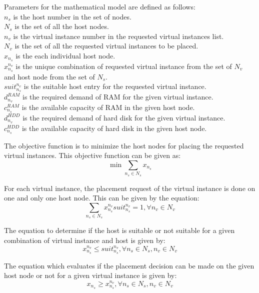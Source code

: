 Parameters for the mathematical model are defined as follows:
\\$n_s$ is the host number in the set of nodes.
\\$N_s$ is the set of all the host nodes.
\\$n_v$ is the virtual instance number in the requested virtual instances list.
\\$N_v$ is the set of all the requested virtual instances to be placed.
\\$x_{n_s}$ is the each individual host node.
\\$x_{n_s}^{n_v}$ is the unique combination of requested virtual instance from the set of $N_v$ and host node from the set of $N_s$.
\\$suit_{n_s}^{n_v}$ is the suitable host entry for the requested virtual instance.
\\$d_{n_v}^{RAM}$ is the required demand of RAM for the given virtual instance.
\\$c_{n_s}^{RAM}$ is the available capacity of RAM in the given host node.
\\$d_{n_v}^{HDD}$ is the required demand of hard disk for the given virtual instance.
\\$c_{n_s}^{HDD}$ is the available capacity of hard disk in the given host node.

The objective function is to minimize the host nodes for placing the requested virtual instances. 
This objective function can be given as:
\begin{equation} \label{eq:1}
\min{\sum_{n_s \in N_s}{x_{n_s}}}
\end{equation}

For each virtual instance, the placement request of the virtual instance is done on one and only one host node. This can be given by the equation:
\begin{equation} \label{eq:2}
\sum_{n_s \in N_s}{x_{n_s}^{n_v}}{suit_{n_s}^{n_v}} = 1, \forall{n_v} \in N_v
\end{equation}

The equation to determine if the host is suitable or not suitable for a given combination of virtual instance and host is given by:
\begin{equation} \label{eq:3}
x_{n_s}^{n_v} \leq suit_{n_s}^{n_v},\forall{n_s} \in N_s, n_v \in N_v
\end{equation}

The equation which evaluates if the placement decision can be made on the given host node or not for a given virtual instance is given by:
\begin{equation} \label{eq:4}
x_{n_s} \geq x_{n_s}^{n_v},\forall{n_s} \in N_s, n_v \in N_v
\end{equation}

